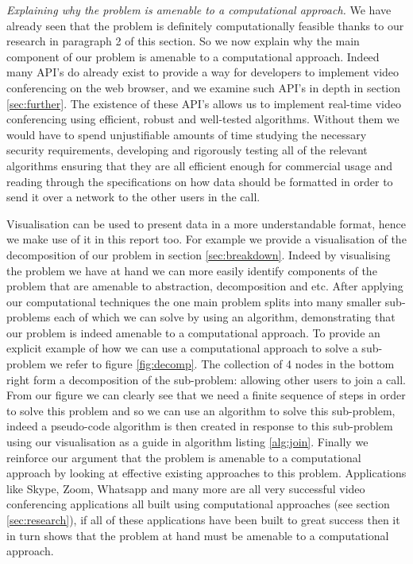 \textit{Explaining why the problem is amenable to a
computational approach.} We have already seen that the
problem is definitely computationally feasible thanks to
our research in paragraph 2 of this section. So we now
explain why the main component of our problem is amenable
to a computational approach. Indeed many API's do already
exist to provide a way for developers to implement video
conferencing on the web browser, and we examine such API's
in depth in section \ref{sec:further}. The existence of these
API's allows us to implement real-time video conferencing
using efficient, robust and well-tested algorithms. Without
them we would have to spend unjustifiable amounts of time
studying the necessary security requirements, developing and
rigorously testing all of the relevant algorithms ensuring
that they are all efficient enough for commercial usage and
reading
through the specifications on how data should be formatted
in order to send it over a network to the other users in the
call. \\ \vspace{0.2cm}

Visualisation can be used to present data in a more
understandable format, hence we make use of it in this report
too. For example we provide a visualisation of the decomposition
of our problem in section \ref{sec:breakdown}. Indeed by
visualising the problem we have at hand we can more easily
identify components of the problem that are amenable to
abstraction, decomposition and etc. After applying our
computational techniques the one main problem splits into many
smaller sub-problems each of which we can solve by using an
algorithm, demonstrating that our problem is indeed amenable to
a computational approach. To provide an explicit example of how
we can use a computational approach to solve a sub-problem we refer
to figure \ref{fig:decomp}. The collection of 4 nodes in the
bottom right form a decomposition of the sub-problem: allowing other
users to join a call. From our figure we can clearly see that we
need a finite sequence of steps in order to solve this problem and
so we can use an algorithm to solve this sub-problem, indeed a
pseudo-code algorithm is then created in response to this sub-problem
using our visualisation as a guide in algorithm listing \ref{alg:join}.
Finally we reinforce our argument that the problem is amenable to a
computational approach by looking at effective existing
approaches to this problem. Applications like Skype, Zoom,
Whatsapp and many more are all very successful video conferencing
applications all built using computational approaches (see
section \ref{sec:research}), if all of these applications
have been
built to great success then it in turn shows that the problem
at hand must be amenable to a computational approach.

